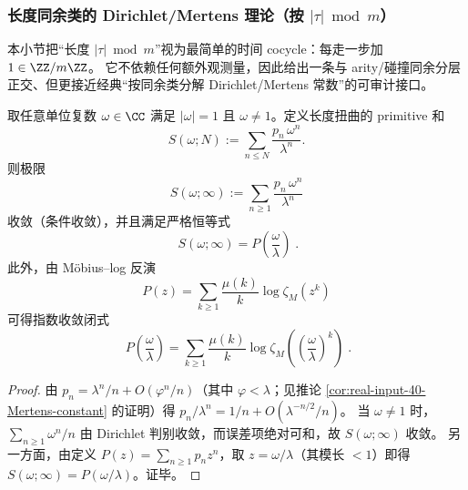 \subsubsection{长度同余类的 Dirichlet/Mertens 理论（按 \texorpdfstring{$|\tau|\bmod m$}{|tau| mod m}）}\label{app:real-input-40-length-mertens}
本小节把“长度 \(|\tau|\bmod m\)”视为最简单的时间 cocycle：每走一步加 \(1\in\ZZ/m\ZZ\)。
它不依赖任何额外观测量，因此给出一条与 arity/碰撞同余分层正交、但更接近经典“按同余类分解 Dirichlet/Mertens 常数”的可审计接口。

\begin{proposition}\label{prop:real-input-40-length-twist-converge}
取任意单位复数 \(\omega\in\CC\) 满足 \(|\omega|=1\) 且 \(\omega\neq 1\)。定义长度扭曲的 primitive 和
\[
S(\omega;N):=\sum_{n\le N}\frac{p_n\,\omega^n}{\lambda^n}.
\]
则极限
\[
S(\omega;\infty):=\sum_{n\ge 1}\frac{p_n\,\omega^n}{\lambda^n}
\]
收敛（条件收敛），并且满足严格恒等式
\[
\boxed{\;
S(\omega;\infty)=P\!\left(\frac{\omega}{\lambda}\right)\; }.
\]
此外，由 Möbius--log 反演
\[
P(z)=\sum_{k\ge 1}\frac{\mu(k)}{k}\log\zeta_M(z^k)
\]
可得指数收敛闭式
\[
\boxed{\;
P\!\left(\frac{\omega}{\lambda}\right)
=\sum_{k\ge 1}\frac{\mu(k)}{k}\log \zeta_M\!\left(\left(\frac{\omega}{\lambda}\right)^k\right)\; }.
\]
\end{proposition}
\begin{proof}
由 \(p_n=\lambda^n/n+O(\varphi^n/n)\)（其中 \(\varphi<\lambda\)；见推论 \ref{cor:real-input-40-Mertens-constant} 的证明）得
\(
p_n/\lambda^n=1/n+O(\lambda^{-n/2}/n)
\)。
当 \(\omega\neq 1\) 时，\(\sum_{n\ge 1}\omega^n/n\) 由 Dirichlet 判别收敛，而误差项绝对可和，故 \(S(\omega;\infty)\) 收敛。
另一方面，由定义 \(P(z)=\sum_{n\ge 1}p_n z^n\)，取 \(z=\omega/\lambda\)（其模长 \(<1\)）即得 \(S(\omega;\infty)=P(\omega/\lambda)\)。证毕。
\end{proof}

